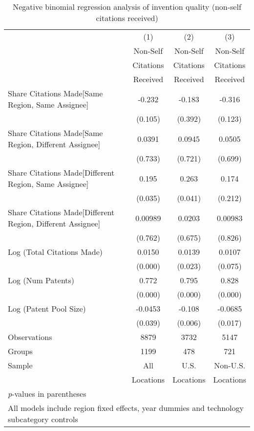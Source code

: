 {
\def\sym#1{\ifmmode^{#1}\else\(^{#1}\)\fi}
\begin{longtable}{l*{3}{c}}
\caption{Negative binomial regression analysis of invention quality (non-self citations received) \label{model192021}}\\
\hline\hline\endfirsthead\hline\endhead\hline\endfoot\endlastfoot
                &\multicolumn{1}{c}{(1)}&\multicolumn{1}{c}{(2)}&\multicolumn{1}{c}{(3)}\\
                &\multicolumn{1}{c}{Non-Self}&\multicolumn{1}{c}{Non-Self}&\multicolumn{1}{c}{Non-Self}\\
                &\multicolumn{1}{c}{Citations}&\multicolumn{1}{c}{Citations}&\multicolumn{1}{c}{Citations}\\
                &\multicolumn{1}{c}{Received}&\multicolumn{1}{c}{Received}&\multicolumn{1}{c}{Received}\\
\hline
Share Citations Made[Same Region, Same Assignee]&   -0.232         &   -0.183         &   -0.316         \\
                &  (0.105)         &  (0.392)         &  (0.123)         \\
Share Citations Made[Same Region, Different Assignee]&   0.0391         &   0.0945         &   0.0505         \\
                &  (0.733)         &  (0.721)         &  (0.699)         \\
Share Citations Made[Different Region, Same Assignee]&    0.195  &    0.263  &    0.174         \\
                &  (0.035)         &  (0.041)         &  (0.212)         \\
Share Citations Made[Different Region, Different Assignee]&  0.00989         &   0.0203         &  0.00983         \\
                &  (0.762)         &  (0.675)         &  (0.826)         \\
Log (Total Citations Made)&   0.0150&   0.0139  &   0.0107         \\
                &  (0.000)         &  (0.023)         &  (0.075)         \\
Log (Num Patents)&    0.772&    0.795&    0.828\\
                &  (0.000)         &  (0.000)         &  (0.000)         \\
Log (Patent Pool Size)&  -0.0453  &   -0.108 &  -0.0685  \\
                &  (0.039)         &  (0.006)         &  (0.017)         \\
\hline
Observations    &     8879         &     3732         &     5147         \\
Groups          &     1199         &      478         &      721         \\
Sample&All &U.S. &Non-U.S. \\
          &Locations &Locations&Locations \\
\hline\hline
\multicolumn{4}{l}{\small \textit{p}-values in parentheses}\\
\multicolumn{4}{l}{\small All models include region fixed effects, year dummies and technology subcategory controls}\\
\end{longtable}
}
